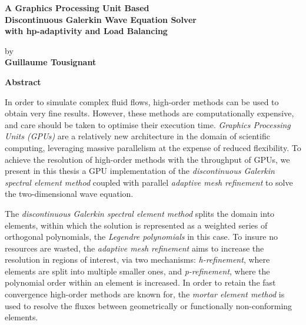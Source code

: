 \thispagestyle{plain} %

\begin{center}
	\vspace*{0.5cm} %
	{ \Large
		\textbf{A Graphics Processing Unit Based \\ 
			Discontinuous Galerkin Wave Equation Solver \\
			with hp-adaptivity and Load Balancing \\
		}
	}
	\vspace{0.4cm}
	\large

	by \\
	\vspace{0.4cm}
	\textbf{Guillaume Tousignant}
	
	\vspace{0.9cm}
	\textbf{Abstract}
	
\end{center}

In order to simulate complex fluid flows, high-order methods can be used to obtain very fine 
results. However, these methods are computationally expensive, and care should be taken to optimise 
their execution time. \textit{Graphics Processing Units (GPUs)} are a relatively new architecture 
in the domain of scientific computing, leveraging massive parallelism at the expense of reduced 
flexibility. To achieve the resolution of high-order methods with the throughput of GPUs, we present
in this thesis a GPU implementation of the \textit{discontinuous Galerkin spectral element method}
coupled with parallel \textit{adaptive mesh refinement} to solve the two-dimensional wave equation. 

The \textit{discontinuous Galerkin spectral element method} splits the domain into elements,  within
which the solution is represented as a weighted series of orthogonal polynomials, the
\textit{Legendre polynomials} in this case. To insure no resources are wasted, the \textit{adaptive
mesh refinement} aims to increase the resolution in regions of interest, via two mechanisms:
\textit{h-refinement}, where elements are split into multiple smaller ones, and
\textit{p-refinement}, where the polynomial order within an element is increased. In order to retain
the fast convergence high-order methods are known for, the \textit{mortar element method} is used to
resolve the fluxes between geometrically or functionally non-conforming elements.

